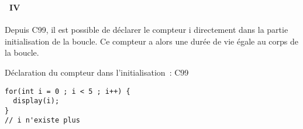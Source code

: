 \begin{frame}[containsverbatim]
  \frametitle{\secname}
  \framesubtitle{\subsecname~IV}
  
  Depuis C99, il est possible de déclarer le compteur i directement dans la partie initialisation de la boucle. Ce compteur a alors une durée de vie égale au corps de 
  la boucle.
  \vspace{0.5cm}
  \begin{exampleblock}{Déclaration du compteur dans l'initialisation~: C99}
    \begin{verbatim}
for(int i = 0 ; i < 5 ; i++) {
  display(i);
}
// i n'existe plus\end{verbatim}
  \end{exampleblock}
\end{frame}

